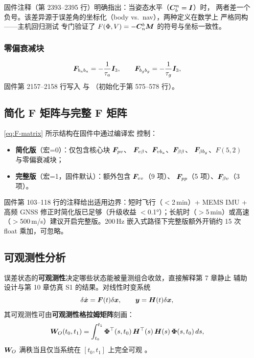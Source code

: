 \begin{remark}
固件注释（第 2393--2395 行）明确指出：当姿态水平（$\boldsymbol{C}_b^n = \boldsymbol{I}$）时，
两者差一个负号。该差异源于误差角的坐标化（body vs.\ nav），两种定义在数学上
严格同构——主机回归测试  专门验证了
$F(\Phi,V) = -\boldsymbol{C}_n^b\boldsymbol{M}$ 的符号与坐标一致性。
\end{remark}

\subsubsection{零偏衰减块}

\begin{equation}
  \boldsymbol{F}_{b_a b_a} = -\frac{1}{\tau_a}\boldsymbol{I}_3, \qquad
  \boldsymbol{F}_{b_g b_g} = -\frac{1}{\tau_g}\boldsymbol{I}_3,
  \label{eq:F-bias-decay}
\end{equation}
固件第 2157--2158 行写入  与
（初始化于第 575--578 行）。

\subsection{简化 F 矩阵与完整 F 矩阵}

\cref{eq:F-matrix} 所示结构在固件中通过编译宏
 控制：
\begin{itemize}
  \item \textbf{简化版}（宏=0）：仅包含核心块 $\boldsymbol{F}_{pv}$、
    $\boldsymbol{F}_{v\beta}$、$\boldsymbol{F}_{v b_a}$、$\boldsymbol{F}_{\beta\beta}$、
    $\boldsymbol{F}_{\beta b_g}$、$F(5,2)$ 与零偏衰减块；
  \item \textbf{完整版}（宏=1，固件默认）：额外包含 $\boldsymbol{F}_{vv}$（9 项）、
    $\boldsymbol{F}_{pp}$（5 项）、$\boldsymbol{F}_{\beta v}$（3 项）。
\end{itemize}
固件第 103--118 行的注释给出适用边界：短时飞行（$<$2\,min）+ MEMS IMU + 高频
GNSS 修正时简化版已足够（升级收益 $<$0.1°）；长航时（$>$5\,min）或高速
（$>$500\,m/s）建议开启完整版。200\,Hz 嵌入式路径下完整版额外开销约 15 次
float 乘加，可忽略。

\subsection{可观测性分析}

误差状态的\textbf{可观测性}决定哪些状态能被量测组合收敛，直接解释第 7 章静止
辅助设计与第 10 章仿真 S1 的结果。对线性时变系统
\begin{equation}
  \delta\dot{\boldsymbol{x}} = \boldsymbol{F}(t)\delta\boldsymbol{x}, \qquad
  \boldsymbol{y} = \boldsymbol{H}(t)\delta\boldsymbol{x},
  \label{eq:obs-sys}
\end{equation}
其可观测性可由\textbf{可观测性格拉姆矩阵}刻画：
\begin{equation}
  \boldsymbol{W}_O(t_0, t_1) = \int_{t_0}^{t_1}
    \bm{\Phi}^{\top}(s, t_0)\,\boldsymbol{H}^{\top}(s)\,\boldsymbol{H}(s)\,\bm{\Phi}(s, t_0)\,ds,
  \label{eq:gramian}
\end{equation}
$\boldsymbol{W}_O$ 满秩当且仅当系统在 $[t_0, t_1]$ 上完全可观 \cite{crassidis2011}。

